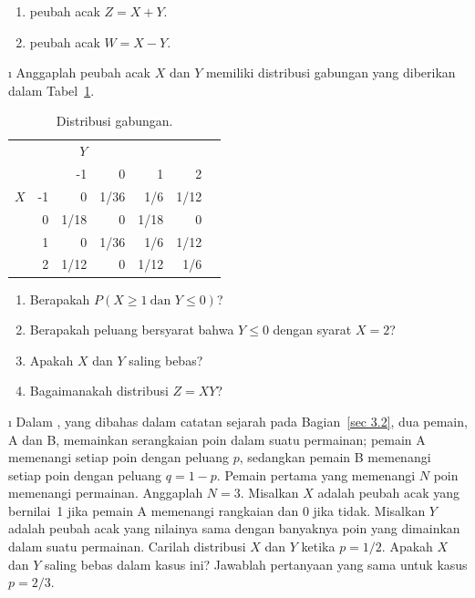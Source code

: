 \begin{LJSItem}
\begin{enumerate}
\item peubah acak $Z = X + Y$.

\item peubah acak $W = X - Y$.
\end{enumerate}

\i\label{exer 5.1.10} Anggaplah peubah acak $X$ dan $Y$ memiliki distribusi gabungan
yang diberikan dalam Tabel~\ref{table 4.5}.
\begin{table}
\centering
\begin{tabular}{lr|rrrrr} 
     &     &  $Y$  &       &        &        \\
     &     &   -1  &  0    &  1     &  2     \\ \hline
$X$  & -1  &   0   & 1/36  &  1/6   & 1/12   \\
     &  0  & 1/18  &  0    &  1/18  &  0     \\
     &  1  &   0   & 1/36  &  1/6   & 1/12   \\
     &  2  & 1/12  &  0    &  1/12  & 1/6    \\
\end{tabular}
\caption{Distribusi gabungan.}
\label{table 4.5}
\end{table}

\begin{enumerate}
\item Berapakah $P(X \geq 1\ \mbox {dan\ } Y \leq 0)$?

\item Berapakah peluang bersyarat bahwa $Y \leq 0$ dengan syarat $X = 2$?

\item Apakah $X$ dan $Y$ saling bebas?

\item Bagaimanakah distribusi $Z = XY$?
\end{enumerate}

\i\label{exer 5.1.11} Dalam , yang dibahas dalam 
catatan sejarah pada Bagian~\ref{sec 3.2}, dua pemain, A dan B, memainkan serangkaian poin dalam suatu
permainan; pemain A memenangi setiap poin dengan peluang $p$, sedangkan pemain B memenangi setiap poin dengan
peluang
$q = 1 - p$.  Pemain pertama yang memenangi $N$ poin memenangi permainan.  Anggaplah $N = 3$.  Misalkan $X$
adalah peubah acak yang bernilai~1 jika pemain A memenangi rangkaian dan 0 jika tidak.  Misalkan
$Y$ adalah peubah acak yang nilainya sama dengan banyaknya poin yang dimainkan dalam suatu permainan.  Carilah
distribusi $X$ dan $Y$ ketika $p = 1/2$.  Apakah $X$ dan $Y$ saling bebas dalam kasus ini?  Jawablah
pertanyaan yang sama untuk kasus $p = 2/3$.


\end{LJSItem}
